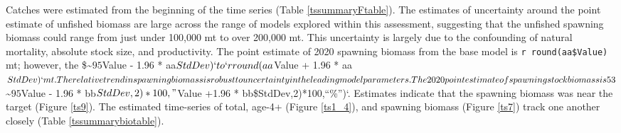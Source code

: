 \documentclass[11pt,
  english,
  a4paper,
]{article}
\begin{document}
Catches were estimated from the beginning of the time series (Table \ref{tssummaryFtable}). The estimates of uncertainty around the point estimate of unfished biomass are large across the range of models explored within this assessment, suggesting that the unfished spawning biomass could range from just under 100,000 mt to over 200,000 mt. This uncertainty is largely due to the confounding of natural mortality, absolute stock size, and productivity. The point estimate of 2020 spawning biomass from the base model is \texttt{r\ round(aa\$Value)} mt; however, the \$\sim{\(95%
\)\leavevmode\tagmcend\tagstructend}Value - 1.96 * aa{\(StdDev)` to ` r round(aa\)\leavevmode\tagmcend\tagstructend}Value + 1.96 * aa{\(StdDev)` mt. The relative trend in spawning biomass is robust to uncertainty in the leading model parameters. The 2020 point estimate of spawning stock biomass is 53%
\)\leavevmode\tagmcend\tagstructend}\sim{\(95%
\)\leavevmode\tagmcend\tagstructend}Value - 1.96 * bb{\(StdDev,2)*100,"%
\)\leavevmode\tagmcend\tagstructend}Value +1.96 * bb\$StdDev,2)*100,``\%'')`. Estimates indicate that the spawning biomass was near the target (Figure \ref{ts9}). The estimated time-series of total, age-4+ (Figure \ref{ts1_4}), and spawning biomass (Figure \ref{ts7}) track one another closely (Table \ref{tssummarybiotable}).

\leavevmode\tagmcend\tagstructend\par

\end{document}
